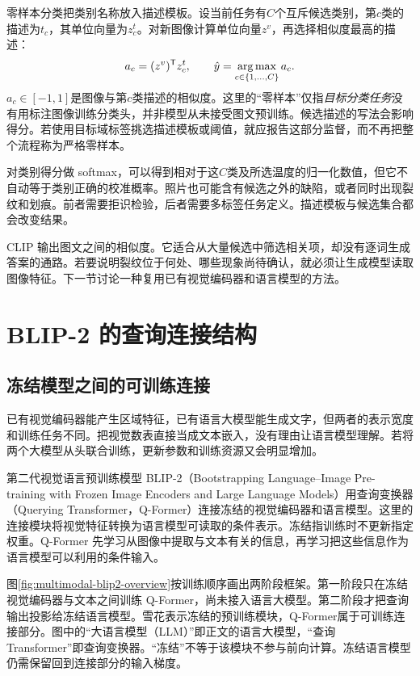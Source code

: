 零样本分类把类别名称放入描述模板。设当前任务有$C$个互斥候选类别，第$c$类的描述为$t_c$，其单位向量为$z_c^t$。对新图像计算单位向量$z^v$，再选择相似度最高的描述：
\begin{equation}
 a_c=(z^v)^{\mathsf T}z_c^t,\qquad
 \hat y=\mathop{\mathrm{arg\,max}}_{c\in\{1,\ldots,C\}}a_c.
\end{equation}
$a_c\in[-1,1]$是图像与第$c$类描述的相似度。这里的“零样本”仅指\emph{目标分类任务}没有用标注图像训练分类头，并非模型从未接受图文预训练。候选描述的写法会影响得分。若使用目标域标签挑选描述模板或阈值，就应报告这部分监督，而不再把整个流程称为严格零样本。

对类别得分做 softmax，可以得到相对于这$C$类及所选温度的归一化数值，但它不自动等于类别正确的校准概率。照片也可能含有候选之外的缺陷，或者同时出现裂纹和划痕。前者需要拒识检验，后者需要多标签任务定义。描述模板与候选集合都会改变结果。

CLIP 输出图文之间的相似度。它适合从大量候选中筛选相关项，却没有逐词生成答案的通路。若要说明裂纹位于何处、哪些现象尚待确认，就必须让生成模型读取图像特征。下一节讨论一种复用已有视觉编码器和语言模型的方法。

\section{BLIP-2 的查询连接结构}
\subsection{冻结模型之间的可训练连接}
已有视觉编码器能产生区域特征，已有语言大模型能生成文字，但两者的表示宽度和训练任务不同。把视觉数表直接当成文本嵌入，没有理由让语言模型理解。若将两个大模型从头联合训练，更新参数和训练资源又会明显增加。

第二代视觉语言预训练模型 BLIP-2（Bootstrapping Language--Image Pre-training with Frozen Image Encoders and Large Language Models）用查询变换器（Querying Transformer，Q-Former）连接冻结的视觉编码器和语言模型。这里的连接模块将视觉特征转换为语言模型可读取的条件表示。冻结指训练时不更新指定权重。Q-Former 先学习从图像中提取与文本有关的信息，再学习把这些信息作为语言模型可以利用的条件输入。

图\ref{fig:multimodal-blip2-overview}按训练顺序画出两阶段框架。第一阶段只在冻结视觉编码器与文本之间训练 Q-Former，尚未接入语言大模型。第二阶段才把查询输出投影给冻结语言模型。雪花表示冻结的预训练模块，Q-Former属于可训练连接部分。图中的“大语言模型（LLM）”即正文的语言大模型，“查询 Transformer”即查询变换器。“冻结”不等于该模块不参与前向计算。冻结语言模型仍需保留回到连接部分的输入梯度。

